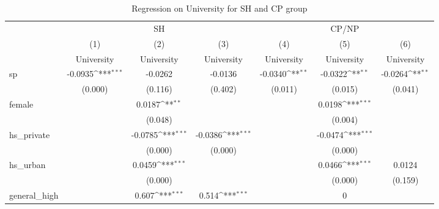 \documentclass[]{AEA}
\def\sym#1{\ifmmode^{#1}\else\(^{#1}\)\fi}
\begin{document}
    \begin{center}
    \begin{table}
    \caption{Regression on University for SH and CP group}
    \setlength{\tabcolsep}{0.5mm}
    \begin{tabular}{l*{6}c}
    \toprule
    &\multicolumn{3}{c}{SH} &\multicolumn{3}{c}{CP/NP} \\
    \cmidrule(l){2-4}\cmidrule(l){5-7}
    &\multicolumn{1}{c}{(1)}&\multicolumn{1}{c}{(2)}&\multicolumn{1}{c}{(3)}&\multicolumn{1}{c}{(4)}&\multicolumn{1}{c}{(5)}&\multicolumn{1}{c}{(6)} \\
    &\multicolumn{1}{c}{University}&\multicolumn{1}{c}{University}&\multicolumn{1}{c}{University}&\multicolumn{1}{c}{University}&\multicolumn{1}{c}{University}&\multicolumn{1}{c}{University} \\
    \midrule
    sp          &     -0.0935\sym{***}&     -0.0262         &     -0.0136         &     -0.0340\sym{**} &     -0.0322\sym{**} &     -0.0264\sym{**} \\
                &     (0.000)         &     (0.116)         &     (0.402)         &     (0.011)         &     (0.015)         &     (0.041)         \\
    [1em]
    female      &                     &      0.0187\sym{**} &                     &                     &      0.0198\sym{***}&                     \\
                &                     &     (0.048)         &                     &                     &     (0.004)         &                     \\
    [1em]
    hs\_private  &                     &     -0.0785\sym{***}&     -0.0386\sym{***}&                     &     -0.0474\sym{***}&                     \\
                &                     &     (0.000)         &     (0.000)         &                     &     (0.000)         &                     \\
    [1em]
    hs\_urban    &                     &      0.0459\sym{***}&                     &                     &      0.0466\sym{***}&      0.0124         \\
                &                     &     (0.000)         &                     &                     &     (0.000)         &     (0.159)         \\
    [1em]
    general\_high&                     &       0.607\sym{***}&       0.514\sym{***}&                     &           0         &                     \\

\end{tabular}
\end{table}
\end{center}
\end{document}
